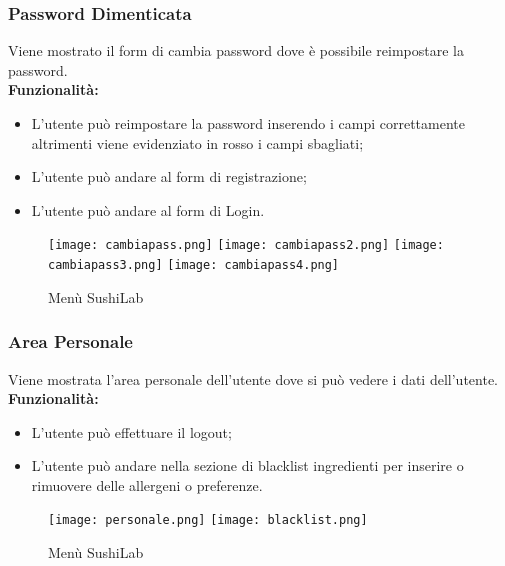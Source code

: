 \subsubsection{Password Dimenticata}
Viene mostrato il form di cambia password dove è possibile reimpostare la password.\\
\textbf{Funzionalità:}
\begin{itemize}
    \item L'utente può reimpostare la password inserendo i campi correttamente altrimenti viene evidenziato in rosso i campi sbagliati;
    \item L'utente può andare al form di registrazione;
    \item L'utente può andare al form di Login.
\end{itemize}
\begin{figure}[H]
    \centering
    \texttt{[image: cambiapass.png]}
    \texttt{[image: cambiapass2.png]}
    \texttt{[image: cambiapass3.png]}
    \texttt{[image: cambiapass4.png]}
    \caption{Menù SushiLab}
\end{figure}
\subsubsection{Area Personale}
Viene mostrata l'area personale dell'utente dove si può vedere i dati dell'utente.
\textbf{Funzionalità:}
\begin{itemize}
    \item L'utente può effettuare il logout;
    \item L'utente può andare nella sezione di blacklist ingredienti per inserire o rimuovere delle allergeni o preferenze.
\end{itemize}
\begin{figure}[H]
    \centering
    \texttt{[image: personale.png]}
    \texttt{[image: blacklist.png]}
    \caption{Menù SushiLab}
\end{figure}
\label{cap:menu.component}